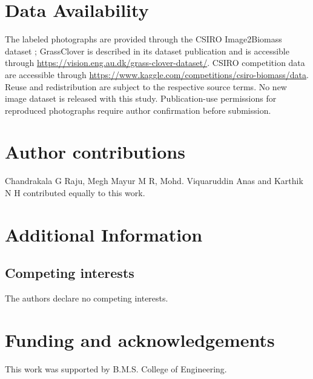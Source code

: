 \documentclass[pdflatex,a4paper,sn-nature]{sn-jnl}
\begin{document}
\section*{Data Availability}
The labeled photographs are provided through the CSIRO Image2Biomass dataset \cite{csiro2025image2biomass}; GrassClover is described in its dataset publication \cite{skovsen2019grassclover} and is accessible through \url{https://vision.eng.au.dk/grass-clover-dataset/}. CSIRO competition data are accessible through \url{https://www.kaggle.com/competitions/csiro-biomass/data}. Reuse and redistribution are subject to the respective source terms. No new image dataset is released with this study. Publication-use permissions for reproduced photographs require author confirmation before submission.

\section*{Author contributions}
Chandrakala G Raju, Megh Mayur M R, Mohd. Viquaruddin Anas and Karthik N H contributed equally to this work.
\section*{Additional Information}
\subsection*{Competing interests}
The authors declare no competing interests.
\section*{Funding and acknowledgements}
This work was supported by B.M.S. College of Engineering.
\end{document}
